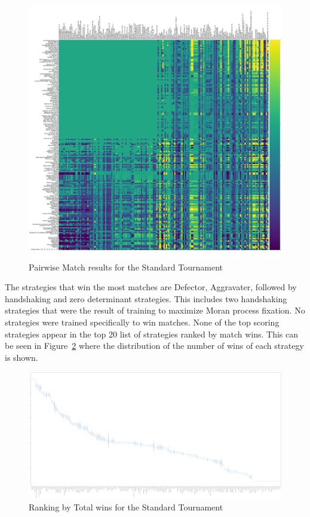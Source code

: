 \documentclass{article}
\begin{document}
\begin{figure}[!hbtp]
    \includegraphics[width=\textwidth]{./assets/standard_scores_heatmap.pdf}
    \caption{Pairwise Match results for the Standard Tournament}
    \label{fig:standard_heatmap}
\end{figure}

The strategies that win the most matches are Defector, Aggravater, followed by
handshaking and zero determinant strategies. This includes two handshaking
strategies that were the result of training to maximize Moran process fixation.
No strategies were trained specifically to win matches.
None of the top scoring
strategies appear in the top 20 list of strategies ranked by match wins.
This can be seen in Figure~\ref{fig:standard_winplot} where the distribution of
the number of wins of each strategy is shown.

\begin{landscape}
    \begin{figure}[!hbtp]
        \centering
        \includegraphics[width=\textwidth]{./assets/standard_wins_boxplots.pdf}
        \caption{Ranking by Total wins for the Standard Tournament}
        \label{fig:standard_winplot}
    \end{figure}
\end{landscape}
\end{document}
